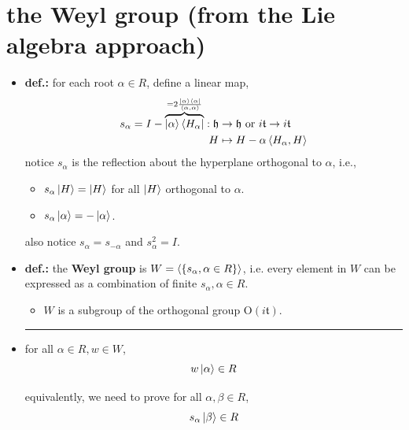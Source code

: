\section{the Weyl group (from the Lie algebra approach)}
\begin{itemize}
	\item \textbf{def.:} for each root $\alpha \in R$, define a linear map,
	\begin{align}
		s_\alpha = I - \overbrace{\ket{\alpha} \bra{H_\alpha}}^{= 2 \frac{\ket{\alpha} \bra{\alpha}}{\braket{\alpha, \alpha}}} : \mathfrak{h} & \rightarrow \mathfrak{h} \ \text{or} \ i \mathfrak{t} \rightarrow i \mathfrak{t} \notag \\
		H & \mapsto H - \alpha \braket{H_\alpha, H}
	\end{align}
	notice $s_\alpha$ is the reflection about the hyperplane orthogonal to $\alpha$, i.e.,
	\begin{itemize}
		\item $s_\alpha \ket{H} = \ket{H}$ for all $\ket{H}$ orthogonal to $\alpha$.
		
		\item $s_\alpha \ket{\alpha} = - \ket{\alpha}$.
	\end{itemize}
	also notice $s_\alpha = s_{- \alpha}$ and $s_\alpha^2 = I$.
	
	\item \textbf{def.:} the \textbf{Weyl group} is $W = \braket{\{s_\alpha, \alpha \in R\}}$, i.e. every element in $W$ can be expressed as a combination of finite $s_\alpha, \alpha \in R$.
	\begin{itemize}
		\item $W$ is a subgroup of the orthogonal group $\mathrm{O}(i \mathfrak{t})$.
	\end{itemize}
	
	\noindent\rule[0.5ex]{\linewidth}{0.5pt} %
	
	\item for all $\alpha \in R, w \in W$,
	\begin{equation} \label{3.5.2}
		w \ket{\alpha} \in R
	\end{equation}
	
	\begin{tcolorbox}[title=proof:]
		equivalently, we need to prove for all $\alpha, \beta \in R$,
		\begin{equation}
			s_\alpha \ket{\beta} \in R
		\end{equation}
		

\end{tcolorbox}
\end{itemize}
